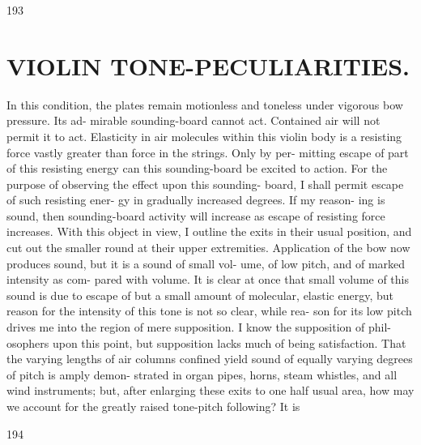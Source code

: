 \documentclass{article}
\begin{document}
193

\section*{VIOLIN TONE-PECULIARITIES.}
In this condition, the plates remain motionless and toneless under vigorous bow pressure. Its ad- mirable sounding-board cannot act. Contained air will not permit it to act. Elasticity in air molecules within this violin body is a resisting force vastly greater than force in the strings. Only by per- mitting escape of part of this resisting energy can this sounding-board be excited to action. For the purpose of observing the effect upon this sounding- board, I shall permit escape of such resisting ener- gy in gradually increased degrees. If my reason- ing is sound, then sounding-board activity will increase as escape of resisting force increases. With this object in view, I outline the exits in their usual position, and cut out the smaller round at their upper extremities. Application of the bow now produces sound, but it is a sound of small vol- ume, of low pitch, and of marked intensity as com- pared with volume. It is clear at once that small volume of this sound is due to escape of but a small amount of molecular, elastic energy, but reason for the intensity of this tone is not so clear, while rea- son for its low pitch drives me into the region of mere supposition. I know the supposition of phil- osophers upon this point, but supposition lacks much of being satisfaction. That the varying lengths of air columns confined yield sound of equally varying degrees of pitch is amply demon- strated in organ pipes, horns, steam whistles, and all wind instruments; but, after enlarging these exits to one half usual area, how may we account for the greatly raised tone-pitch following? It is

194
\end{document}
